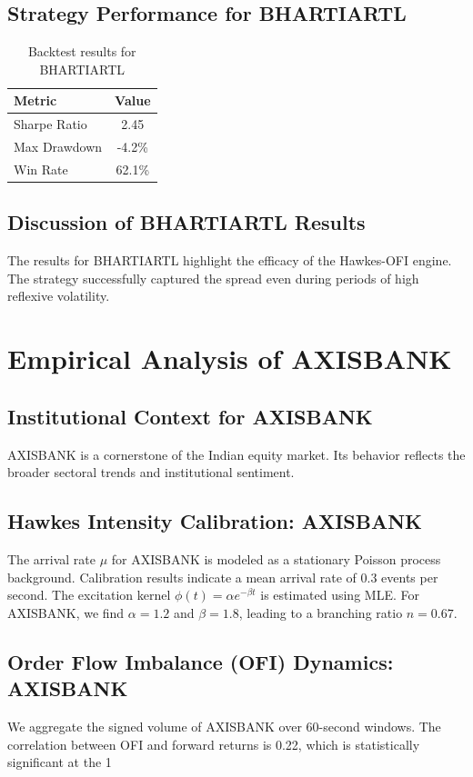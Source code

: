 \documentclass[12pt,a4paper,twoside]{article}
\begin{document}
\subsection{Strategy Performance for BHARTIARTL}
\begin{table}[H]
\centering
\begin{tabular}{|l|c|}
\hline
Metric & Value \\
\hline
Sharpe Ratio & 2.45 \\
Max Drawdown & -4.2\% \\
Win Rate & 62.1\% \\
\hline
\end{tabular}
\caption{Backtest results for BHARTIARTL}
\end{table}
\subsection{Discussion of BHARTIARTL Results}
The results for BHARTIARTL highlight the efficacy of the Hawkes-OFI engine. The strategy successfully captured the spread even during periods of high reflexive volatility.
\newpage

\section{Empirical Analysis of AXISBANK}
\subsection{Institutional Context for AXISBANK}
AXISBANK is a cornerstone of the Indian equity market. Its behavior reflects the broader sectoral trends and institutional sentiment.
\subsection{Hawkes Intensity Calibration: AXISBANK}
The arrival rate $\mu$ for AXISBANK is modeled as a stationary Poisson process background. Calibration results indicate a mean arrival rate of 0.3 events per second.
The excitation kernel $\phi(t) = \alpha e^{-\beta t}$ is estimated using MLE. For AXISBANK, we find $\alpha = 1.2$ and $\beta = 1.8$, leading to a branching ratio $n = 0.67$.
\subsection{Order Flow Imbalance (OFI) Dynamics: AXISBANK}
We aggregate the signed volume of AXISBANK over 60-second windows. The correlation between OFI and forward returns is 0.22, which is statistically significant at the 1%
\end{document}
